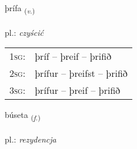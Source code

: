 \documentclass[frontgrid, backgrid]{flacards}\usepackage[]{graphicx}\usepackage[]{xcolor}
\begin{document}
\renewcommand{\flhead}{\vskip5pt \fboxsep=0pt {\small\bfseries\footnotesize Sagnorð | czasownik}}
\renewcommand{\fcfoot}{\vskip5pt \fboxsep=0pt \hspace{2pt}{\small\bfseries\footnotesize 3K}}

\renewcommand{\blhead}{\vskip5pt {\small\bfseries\footnotesize Sagnorð | czasownik }}
\renewcommand{\bcfoot}{\vskip5pt \hspace{2pt}{\small\bfseries\footnotesize 3K}}


{þrífa \small{\textsubscript{(\textit{v.})}} \\[1ex] %
\textphonetic{[θriːva]} \\
pl.: \emph{czyścić} \\  [2ex]
\renewcommand*{\arraystretch}{0.8}
\begin{tabular}{p{1cm}l}
\textsc{1sg}: & þríf -- þreif -- þrifið \\ 
\textsc{2sg}: & þrífur -- þreifst -- þrifið \\ 
\textsc{3sg}: & þrífur -- þreif -- þrifið \\ 
\end{tabular}
}

\renewcommand{\flhead}{\vskip5pt \fboxsep=0pt {\small\bfseries\footnotesize Nafnorð | rzeczownik}}
\renewcommand{\fcfoot}{\vskip5pt \fboxsep=0pt \hspace{2pt}{\small\bfseries\footnotesize 3K}}

\renewcommand{\blhead}{\vskip5pt {\small\bfseries\footnotesize Nafnorð | rzeczownik }}
\renewcommand{\bcfoot}{\vskip5pt \hspace{2pt}{\small\bfseries\footnotesize 3K}}


{búseta \small{\textsubscript{(\textit{f.})}} \\[1ex] %
\textphonetic{[puːsɛta]} \\
pl.: \emph{rezydencja} \\  [2ex]
\renewcommand*{\arraystretch}{0.8}
}
\end{document}
